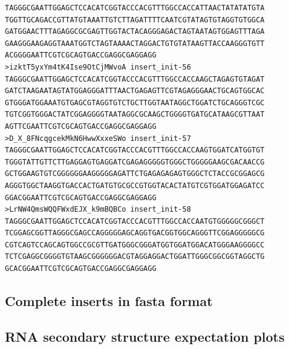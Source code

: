 \documentclass[11pt]{article}
\begin{document}
\begin{verbatim}
TAGGGCGAATTGGAGCTCCACATCGGTACCCACGTTTGGCCACCATTAACTATATATGTA
TGGTTGCAGACCGTTATGTAAATTGTCTTAGATTTTCAATCGTATAGTGTAGGTGTGGCA
GATGGAACTTTAGAGGCGCGAGTTGGTACTACAGGGAGACTAGTAATAGTGGAGTTTAGA
GAAGGGAAGAGGTAAATGGTCTAGTAAAACTAGGACTGTGTATAAGTTACCAAGGGTGTT
ACGGGGAATTCGTCGCAGTGACCGAGGCGAGGAGG
>izktT5yxYm4tK4Ise9OtCjMWvoA insert_init-56
TAGGGCGAATTGGAGCTCCACATCGGTACCCACGTTTGGCCACCAAGCTAGAGTGTAGAT
GATCTAAGAATAGTATGGAGGGATTTAACTGAGAGTTCGTAGAGGGAACTGCAGTGGCAC
GTGGGATGGAAATGTGAGCGTAGGTGTCTGCTTGGTAATAGGCTGGATCTGCAGGGTCGC
TGTCGGTGGGACTATCGGAGGGGTAATAGGCGCAAGCTGGGGTGATGCATAAGCGTTAAT
AGTTCGAATTCGTCGCAGTGACCGAGGCGAGGAGG
>D_X_8FNcqgcekMkN6HwwXxxeSWo insert_init-57
TAGGGCGAATTGGAGCTCCACATCGGTACCCACGTTTGGCCACCAAGTGGATCATGGTGT
TGGGTATTGTTCTTGAGGAGTGAGGATCGAGAGGGGGTGGGCTGGGGGAAGCGACAACCG
GCTGGAAGTGTCGGGGGGAAGGGGGAGATTCTGAGAGAGAGTGGGCTCTACCGCGGAGCG
AGGGTGGCTAAGGTGACCACTGATGTGCGCCGTGGTACACTATGTCGTGGATGGAGATCC
GGACGGAATTCGTCGCAGTGACCGAGGCGAGGAGG
>LrNW4QmsWQQFWxdEJX_k9mBQBCo insert_init-58
TAGGGCGAATTGGAGCTCCACATCGGTACCCACGTTTGGCCACCAATGTGGGGGCGGGCT
TCGGAGCGGTTAGGGCGAGCCAGGGGGAGCAGGTGACGGTGGCAGGGTTCGGAGGGGGCG
CGTCAGTCCAGCAGTGGCCGCGTTGATGGGCGGGATGGTGGATGGACATGGGAAGGGGCC
TCTCGAGGCGGGGTGTAAGCGGGGGGACGTAGGAGGACTGGATTGGGCGGCGGTAGGCTG
GCACGGAATTCGTCGCAGTGACCGAGGCGAGGAGG
\end{verbatim}

\subsection{Complete inserts in fasta format}


\subsection{RNA secondary structure expectation plots}




\pagebreak


\end{document}

